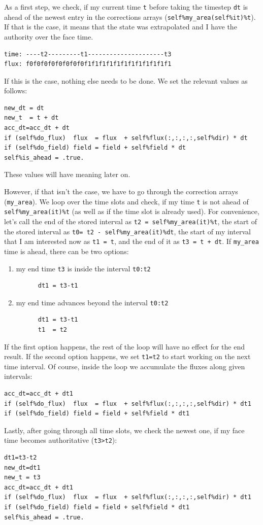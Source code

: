 \documentclass[paper=a4,fontsize=11pt]{scrartcl}
\numberwithin{equation}{section}		%
\numberwithin{figure}{section}			%
\numberwithin{table}{section}				%
\newcommand{\codecolor}{\color{Blue}}
\newcommand{\Code}[1]{{\codecolor\texttt{#1}}}
\begin{document}
As a first step, we check, if my current time \Code{t} before taking the timestep \Code{dt} is ahead of the newest entry in the corrections arrays (\Code{self\%my\_area(self\%it)\%t}). If that is the case, it means that the state was extrapolated and I have the authority over the face time.
{\codecolor\begin{verbatim}
time: ----t2---------t1---------------------t3
flux: f0f0f0f0f0f0f0f0f1f1f1f1f1f1f1f1f1f1f1f1
\end{verbatim}}
If this is the case, nothing else needs to be done. We set the relevant values as follows:
{\codecolor\begin{verbatim}
new_dt = dt
new_t  = t + dt
acc_dt=acc_dt + dt
if (self%do_flux)  flux  = flux  + self%flux(:,:,:,:,self%dir) * dt     
if (self%do_field) field = field + self%field * dt
self%is_ahead = .true.
\end{verbatim}}
These values will have meaning later on.

However, if that isn't the case, we have to go through the correction arrays (\Code{my\_area}). We loop over the time slots and check, if my time \Code{t} is not ahead of \Code{self\%my\_area(it)\%t} (as well as if the time slot is already used). For convenience, let's call the end of the stored interval as \Code{t2 = self\%my\_area(it)\%t}, the start of the stored interval as \Code{t0= t2 - self\%my\_area(it)\%dt}, the start of my interval that I am interested now as \Code{t1 = t}, and the end of it as \Code{t3 = t + dt}.
If \Code{my\_area} time is ahead, there can be two options:
\begin{enumerate}
    \item my end time \Code{t3} is inside the interval \Code{t0:t2} \\
    {\codecolor\begin{verbatim}
      dt1 = t3-t1
    \end{verbatim}}
    \item my end time advances beyond the interval \Code{t0:t2} \\
    {\codecolor\begin{verbatim}
      dt1 = t3-t1
      t1  = t2
    \end{verbatim}}
\end{enumerate}
If the first option happens, the rest of the loop will have no effect for the end result. If the second option happens, we set \Code{t1=t2} to start working on the next time interval. Of course, inside the loop we accumulate the fluxes along given intervals:
{\codecolor\begin{verbatim}
acc_dt=acc_dt + dt1
if (self%do_flux)  flux  = flux  + self%flux(:,:,:,:,self%dir) * dt1       
if (self%do_field) field = field + self%field * dt1
\end{verbatim}}
Lastly, after going through all time slots, we check the newest one, if my face time becomes authoritative (\Code{t3>t2}):
{\codecolor\begin{verbatim}
dt1=t3-t2
new_dt=dt1
new_t = t3
acc_dt=acc_dt + dt1
if (self%do_flux)  flux  = flux  + self%flux(:,:,:,:,self%dir) * dt1       
if (self%do_field) field = field + self%field * dt1 
self%is_ahead = .true.
\end{verbatim}}
\end{document}
